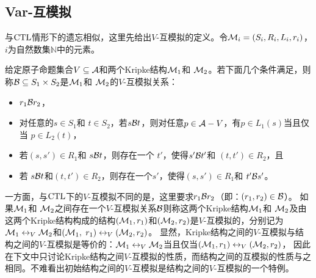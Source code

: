 \subsection{Var-互模拟}
与$\textrm{CTL}$情形下的遗忘相似，这里先给出$V$-互模拟的定义。令${\cal M}_i = (S_i, R_i, L_i, r_i)$，$i$为自然数集$\mathbb{N}$中的元素。
\begin{definition}[$V$-互模拟]\label{def:VB}
	给定原子命题集合$V \subseteq {\cal A}$和两个Kripke结构${\cal M}_1$和 ${\cal M}_2$。若下面几个条件满足，则称${\cal B}\subseteq S_1 \times S_2$是${\cal M}_1$和 ${\cal M}_2$的$V$-互模拟关系：
	\begin{itemize}
		\item $r_1 {\cal B} r_2$，
		\item 对任意的$s\in S_1$和 $t\in S_2$，若$s {\cal B} t$，则对任意$p \in {\cal A}- V$，有$p \in L_1(s)$当且仅当 $p \in L_2(t)$，
		\item 若$(s, s')\in R_1$和 $s {\cal B} t$，则存在一个 $t'$，使得$s' {\cal B} t'$和 $(t, t')\in R_2$，且
		\item 若 $s {\cal B} t$和$(t, t')\in R_2$，则存在一个$s'$，使得$(s, s')\in R_1$和 $t' {\cal B} s'$。
	\end{itemize}
\end{definition}

一方面，与$\textrm{CTL}$下的$V$-互模拟不同的是，这里要求$r_1 {\cal B} r_2$（即：$(r_1,r_2)\in {\cal B}$）。
如果${\cal M}_1$和 ${\cal M}_2$之间存在一个$V$-互模拟关系${\cal B}$则称这两个Kripke结构${\cal M}_1$和 ${\cal M}_2$及由这两个Kripke结构构成的结构$({\cal M}_1,r_1)$和$({\cal M}_2,r_2)$是$V$-互模拟的，分别记为${\cal M}_1 \leftrightarrow_V {\cal M}_2$和$({\cal M}_1,$ $r_1) \leftrightarrow_V ({\cal M}_2,r_2)$。
显然，Kripke结构之间的$V$-互模拟与结构之间的$V$-互模拟是等价的：${\cal M}_1 \leftrightarrow_V {\cal M}_2$当且仅当$({\cal M}_1,r_1) \leftrightarrow_V ({\cal M}_2,r_2)$， 因此在下文中只讨论Kripke结构之间$V$-互模拟的性质，而结构之间的互模拟的性质与之相同。不难看出初始结构之间的$V$-互模拟是结构之间的$V$-互模拟的一个特例。


